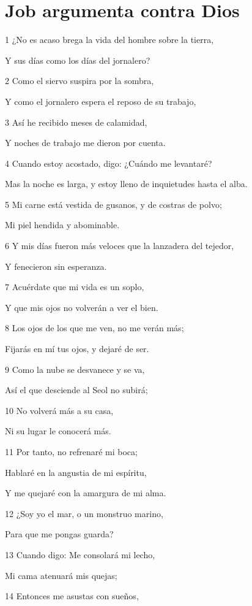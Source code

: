 \section*{Job argumenta contra Dios}

\par 1 ¿No es acaso brega la vida del hombre sobre la tierra,
\par Y sus días como los días del jornalero?
\par 2 Como el siervo suspira por la sombra,
\par Y como el jornalero espera el reposo de su trabajo, 
\par 3 Así he recibido meses de calamidad,
\par Y noches de trabajo me dieron por cuenta.
\par 4 Cuando estoy acostado, digo: ¿Cuándo me levantaré?
\par Mas la noche es larga, y estoy lleno de inquietudes hasta el alba. 
\par 5 Mi carne está vestida de gusanos, y de costras de polvo;
\par Mi piel hendida y abominable.
\par 6 Y mis días fueron más veloces que la lanzadera del tejedor,
\par Y fenecieron sin esperanza.
\par 7 Acuérdate que mi vida es un soplo,
\par Y que mis ojos no volverán a ver el bien.
\par 8 Los ojos de los que me ven, no me verán más;
\par Fijarás en mí tus ojos, y dejaré de ser.
\par 9 Como la nube se desvanece y se va,
\par Así el que desciende al Seol no subirá;
\par 10 No volverá más a su casa,
\par Ni su lugar le conocerá más.
\par 11 Por tanto, no refrenaré mi boca;
\par Hablaré en la angustia de mi espíritu,
\par Y me quejaré con la amargura de mi alma.
\par 12 ¿Soy yo el mar, o un monstruo marino,
\par Para que me pongas guarda?
\par 13 Cuando digo: Me consolará mi lecho,
\par Mi cama atenuará mis quejas; 
\par 14 Entonces me asustas con sueños,
